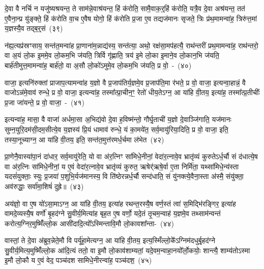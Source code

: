 {\anuvakamend[{प॒श्य॒ति॒ ताभ्या॒मह॑रैदसाव॒ फलꣳ॑ स॒प्त च॑}]}%

दे॒वा वै नर्चि न यजु॑ष्यश्रयन्त॒ ते साम॑न्ने॒वाश्र॑यन्त॒ हिं क॑रोति॒ सामै॒वाक॒र्॒\mbox{}हिं क॑रोति॒ यत्रै॒व दे॒वा अश्र॑यन्त॒ तत॑ ए॒वैना॒न्प्र यु॑ङ्क्ते॒ हिं क॑रोति वा॒च ए॒वैष योगो॒ हिं क॑रोति प्र॒जा ए॒व तद्यज॑मानः सृजते॒ त्रिः प्र॑थ॒मामन्वा॑ह॒ त्रिरु॑त्त॒मां य॒ज्ञस्यै॒व तद्ब॒र्॒\mbox{}सं~(३९)

न॑ह्य॒त्यप्र॑स्रꣳसाय॒ सन्त॑त॒मन्वा॑ह प्रा॒णाना॑म॒न्नाद्य॑स्य॒ सन्त॑त्या॒ अथो॒ रक्ष॑सा॒मप॑हत्यै॒ राथ॑न्तरीं प्रथ॒मामन्वा॑ह॒ राथ॑न्तरो॒ वा अ॒यं लो॒क इ॒ममे॒व लो॒कम॒भि ज॑यति॒ त्रिर्वि गृ॑ह्णाति॒ त्रय॑ इ॒मे लो॒का इ॒माने॒व लो॒कान॒भि ज॑यति॒ बार्\mbox{}ह॑तीमुत्त॒मामन्वा॑ह॒ बार्\mbox{}ह॑तो॒ वा अ॒सौ लो॒को॑\-ऽमुमे॒व लो॒कम॒भि ज॑यति॒ प्र वो॒~-~(४०)

वाजा॒ इत्यनि॑रुक्तां प्राजाप॒त्यामन्वा॑ह य॒ज्ञो वै प्र॒जा\-प॑तिर्य॒ज्ञमे॒व प्र॒जा\-प॑ति॒मा र॑भते॒ प्र वो॒ वाजा॒ इत्यन्वा॒हान्नं॒ वै वाजो\-ऽन्न॑मे॒वाव॑ रुन्धे॒ प्र वो॒ वाजा॒ इत्यन्वा॑ह॒ तस्मा᳚त्प्रा॒चीन॒ꣳ॒ रेतो॑ धीय॒ते\-ऽग्न॒ आ या॑हि वी॒तय॒ इत्या॑ह॒ तस्मा᳚त्प्र॒तीचीः᳚ प्र॒जा जा॑यन्ते॒ प्र वो॒ वाजा॒~-~(४१)

इत्यन्वा॑ह॒ मासा॒ वै वाजा॑ अर्धमा॒सा अ॒भिद्य॑वो दे॒वा ह॒विष्म॑न्तो॒ गौर्घृ॒ताची॑ य॒ज्ञो दे॒वाञ्जि॑गाति॒ यज॑मानः सुम्न॒युरि॒दम॑सी॒दम॒सीत्ये॒व य॒ज्ञस्य॑ प्रि॒यं धामाव॑ रुन्धे॒ यं का॒मये॑त॒ सर्व॒मायु॑रिया॒दिति॒ प्र वो॒ वाजा॒ इति॒ तस्या॒नूच्याग्न॒ आ या॑हि वी॒तय॒ इति॒ सन्त॑त॒मुत्त॑रमर्ध॒र्चमा ल॑भेत~(४२)

प्रा॒णेनै॒वास्या॑पा॒नं दा॑धार॒ सर्व॒मायु॑रेति॒ यो वा अ॑र॒त्निꣳ सा॑मिधे॒नीनां॒ वेदा॑र॒त्नावे॒व भ्रातृ॑व्यं कुरुते\-ऽर्ध॒र्चौ सं द॑धात्ये॒ष वा अ॑र॒त्निः सा॑मिधे॒नीनां॒ य ए॒वं वेदा॑र॒त्नावे॒व भ्रातृ॑व्यं कुरुत॒ ऋषेर्॑\mbox{}ऋषे॒र्वा ए॒ता निर्मि॑ता॒ यथ्सा॑मिधे॒न्य॑स्ता यदसं॑युक्ताः॒ स्युः प्र॒जया॑ प॒शुभि॒र्यज॑मानस्य॒ वि ति॑ष्ठेरन्नर्ध॒र्चौ सन्द॑धाति॒ सं यु॑नक्त्ये॒वैना॒स्ता अ॑स्मै॒ संयु॑क्ता॒ अव॑रुद्धाः॒ सर्वा॑मा॒शिषं॑ दुह्रे॥~(४३)


{\anuvakamend[{ब॒र्॒\mbox{}सं वो॑ जायन्ते॒ प्र वो॒ वाजा॑ लभेत दधाति॒ सन्दश॑ च}]}%

अय॑ज्ञो॒ वा ए॒ष यो॑\-ऽसा॒मा\-ऽग्न॒ आ या॑हि वी॒तय॒ इत्या॑ह रथन्त॒रस्यै॒ष वर्ण॒स्तं त्वा॑ स॒मिद्भि॑रङ्गिर॒ इत्या॑ह वामदे॒व्यस्यै॒ष वर्णो॑ बृ॒हद॑ग्ने सु॒वीर्य॒मित्या॑ह बृह॒त ए॒ष वर्णो॒ यदे॒तं तृ॒चम॒न्वाह॑ य॒ज्ञमे॒व तथ्साम॑न्वन्तं करोत्य॒ग्निर॒मुष्मिँ॑ल्लो॒क आसी॑दादि॒त्यो᳚\-ऽस्मिन्तावि॒मौ लो॒कावशा᳚न्ता-~(४४)

वास्तां॒ ते दे॒वा अ॑ब्रुव॒न्नेते॒मौ वि पर्यू॑हा॒मेत्यग्न॒ आ या॑हि वी॒तय॒ इत्य॒स्मिँल्लो॒के᳚\-ऽग्निम॑दधुर्बृ॒हद॑ग्ने सु॒वीर्य॒मित्य॒मुष्मिँ॑ल्लो॒क आ॑दि॒त्यं ततो॒ वा इ॒मौ लो॒काव॑शाम्यतां॒ यदे॒वम॒न्वाहा॒नयो᳚र्लो॒कयोः॒ शान्त्यै॒ शाम्य॑तो\-ऽस्मा इ॒मौ लो॒कौ य ए॒वं वेद॒ पञ्च॑दश सामिधे॒नीरन्वा॑ह॒ पञ्च॑दश॒~(४५)

